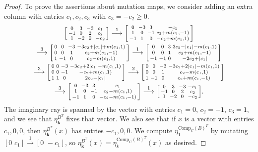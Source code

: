 \documentclass[10pt]{article}
\theoremstyle{definition}
\theoremstyle{remark}
\numberwithin{equation}{section}
\newcommand{\0}{{\mathbf{0}}}
\newcommand{\Comp}{\mathrm{Comp}_C}
\newcommand{\kk}{{\boldsymbol{k}}}
\begin{document}
\begin{proof}
To prove the assertions about mutation maps, we consider adding an extra column with entries $c_1,c_2,c_3$ with $c_3=-c_2\ge0$.
\begin{multline*}
\begin{bsmallmatrix*}
0&3&-3&c_1\\
-1&0&2&c_2\\
1&-2&0&-c_2
\end{bsmallmatrix*}
\overset{1}{\longrightarrow}
\begin{bsmallmatrix*}
0&-3&3&-c_1\\
1&0&-1&c_2+m(c_1,-1)\\
-1&1&0&-c_2+m(c_1,1)
\end{bsmallmatrix*}\\
\overset{3}{\longrightarrow}
\begin{bsmallmatrix*}
0&0&-3&-3c_2+|c_1|+m(c_1,1)\\
0&0&1&c_2+m(c_1,-1)\\
1&-1&0&c_2-m(c_1,1)
\end{bsmallmatrix*}
\overset{1}{\longrightarrow}
\begin{bsmallmatrix*}
0&0&3&3c_2-|c_1|-m(c_1,1)\\
0&0&1&c_2+m(c_1,-1)\\
-1&-1&0&-2c_2+|c_1|
\end{bsmallmatrix*}\\
\overset{3}{\longrightarrow}
\begin{bsmallmatrix*}
0&0&-3&-3c_2+2|c_1|-m(c_1,1)\\
0&0&-1&-c_2+m(c_1,1)\\
1&1&0&2c_2-|c_1|
\end{bsmallmatrix*}
\overset{2}{\longrightarrow}
\begin{bsmallmatrix*}
0&0&-3&-3c_2+2|c_1|-m(c_1,1)\\
0&0&1&c_2-m(c_1,1)\\
1&-1&0&c_2+m(c_1,-1)
\end{bsmallmatrix*}\\
\overset{3}{\longrightarrow}
\begin{bsmallmatrix*}
0&-3&3&c_1\\
1&0&-1&c_2-m(c_1,1)\\
-1&1&0&-c_2-m(c_1,-1)
\end{bsmallmatrix*}
\overset{1}{\longrightarrow}
\begin{bsmallmatrix*}
0&3&-3&-c_1\\
-1&0&2&c_2\\
1&-2&0&-c_2
\end{bsmallmatrix*}.
\end{multline*}
The imaginary ray is spanned by the vector with entries $c_1=0$, $c_2=-1$, $c_3=1$, and we see that $\eta^{B^T}_\kk$ fixes that vector.
We also see that if $x$ is a vector with entries $c_1,0,0$, then $\eta_\kk^{B^T}(x)$ has entries $-c_1,0,0$.
We compute $\eta_1^{\Comp(B)^T}$ by mutating $[0\,\,c_1]\overset{1}{\longrightarrow}[0\,\,-c_1]$, so $\eta^{B^T}_\kk(x)=\eta^{\Comp(B)^T}_k(x)$ as desired.


\end{proof}
\end{document}
